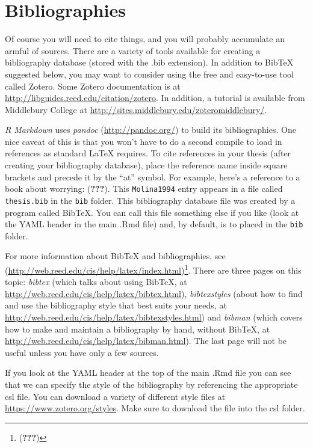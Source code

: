 \documentclass [11pt, proquest] {uwthesis}[2015/03/03]
\begin{document}
\section{Bibliographies}\label{bibliographies}

Of course you will need to cite things, and you will probably accumulate
an armful of sources. There are a variety of tools available for
creating a bibliography database (stored with the .bib extension). In
addition to BibTeX suggested below, you may want to consider using the
free and easy-to-use tool called Zotero. Some Zotero documentation is at
\url{http://libguides.reed.edu/citation/zotero}. In addition, a tutorial
is available from Middlebury College at
\url{http://sites.middlebury.edu/zoteromiddlebury/}.

\emph{R Markdown} uses \emph{pandoc} (\url{http://pandoc.org/}) to build
its bibliographies. One nice caveat of this is that you won't have to do
a second compile to load in references as standard LaTeX requires. To
cite references in your thesis (after creating your bibliography
database), place the reference name inside square brackets and precede
it by the ``at'' symbol. For example, here's a reference to a book about
worrying: ({\textbf{???}}). This \texttt{Molina1994} entry appears in a
file called \texttt{thesis.bib} in the \texttt{bib} folder. This
bibliography database file was created by a program called BibTeX. You
can call this file something else if you like (look at the YAML header
in the main .Rmd file) and, by default, is to placed in the \texttt{bib}
folder.

For more information about BibTeX and bibliographies, see
(\url{http://web.reed.edu/cis/help/latex/index.html})\footnote{({\textbf{???}})}.
There are three pages on this topic: \emph{bibtex} (which talks about
using BibTeX, at \url{http://web.reed.edu/cis/help/latex/bibtex.html}),
\emph{bibtexstyles} (about how to find and use the bibliography style
that best suits your needs, at
\url{http://web.reed.edu/cis/help/latex/bibtexstyles.html}) and
\emph{bibman} (which covers how to make and maintain a bibliography by
hand, without BibTeX, at
\url{http://web.reed.edu/cis/help/latex/bibman.html}). The last page
will not be useful unless you have only a few sources.

If you look at the YAML header at the top of the main .Rmd file you can
see that we can specify the style of the bibliography by referencing the
appropriate csl file. You can download a variety of different style
files at \url{https://www.zotero.org/styles}. Make sure to download the
file into the csl folder.
\end{document}

